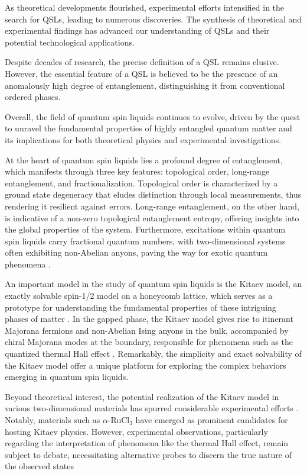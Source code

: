 As theoretical developments flourished, experimental efforts intensified in the search for QSLs, leading to numerous discoveries. The synthesis of theoretical and experimental findings has advanced our understanding of QSLs and their potential technological applications.

Despite decades of research, the precise definition of a QSL remains elusive. However, the essential feature of a QSL is believed to be the presence of an anomalously high degree of entanglement, distinguishing it from conventional ordered phases.

Overall, the field of quantum spin liquids continues to evolve, driven by the quest to unravel the fundamental properties of highly entangled quantum matter and its implications for both theoretical physics and experimental investigations.



At the heart of quantum spin liquids lies a profound degree of entanglement, which manifests through three key features: topological order, long-range entanglement, and fractionalization. Topological order is characterized by a ground state degeneracy that eludes distinction through local measurements, thus rendering it resilient against errors. Long-range entanglement, on the other hand, is indicative of a non-zero topological entanglement entropy, offering insights into the global properties of the system. Furthermore, excitations within quantum spin liquids carry fractional quantum numbers, with two-dimensional systems often exhibiting non-Abelian anyons, paving the way for exotic quantum phenomena \cite{Kitaev2006}.

An important model in the study of quantum spin liquids is the Kitaev model, an exactly solvable spin-1/2 model on a honeycomb lattice, which serves as a prototype for understanding the fundamental properties of these intriguing phases of matter \cite{Kitaev2006}. In the gapped phase, the Kitaev model gives rise to itinerant Majorana fermions and non-Abelian Ising anyons in the bulk, accompanied by chiral Majorana modes at the boundary, responsible for phenomena such as the quantized thermal Hall effect \cite{Kitaev2006}. Remarkably, the simplicity and exact solvability of the Kitaev model offer a unique platform for exploring the complex behaviors emerging in quantum spin liquids.

Beyond theoretical interest, the potential realization of the Kitaev model in various two-dimensional materials has spurred considerable experimental efforts%
. Notably, materials such as $\alpha$-RuCl$_3$ have emerged as prominent candidates for hosting Kitaev physics. However, experimental observations, particularly regarding the interpretation of phenomena like the thermal Hall effect, remain subject to debate, necessitating alternative probes to discern the true nature of the observed states %


